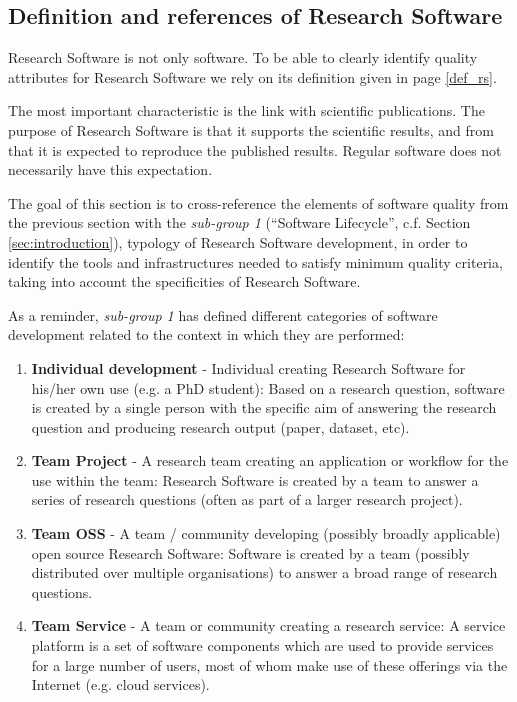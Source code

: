 \subsection{Definition and references of Research Software}
\label{subsec:defrs}

Research Software is not only software. To be able to clearly identify quality attributes for Research Software we rely on its definition given in page \ref{def_rs}.

The most important characteristic is the link with scientific publications. The purpose of Research Software is that it supports the scientific results, and from that it is expected to reproduce the published results. Regular software does not necessarily have this expectation.

The goal of this section is to cross-reference the elements of software quality from the previous section with the \textit{sub-group 1} \cite{sg1tf2023} (``Software Lifecycle'', c.f. Section \ref{sec:introduction}), typology of Research Software development, in order to identify the tools and infrastructures needed to satisfy minimum quality criteria, taking into account the specificities of Research Software.  

As a reminder, \textit{sub-group 1} has defined different categories of software development related to the context in which they are performed:

\begin{enumerate}
    \item \textbf{Individual development} - Individual creating Research Software for his/her own use (e.g. a PhD student): Based on a research question, software is created by a single person with the specific aim of answering the research question and producing research output (paper, dataset, etc).
    \item \textbf{Team Project} - A research team creating an application or workflow for the use within the team: Research Software is created by a team to answer a series of research questions (often as part of a larger research project).
    \item \textbf{Team OSS} - A team / community developing (possibly broadly applicable) open source Research Software: Software is created by a team (possibly distributed over multiple organisations) to answer a broad range of research questions.
    \item \textbf{Team Service} - A team or community creating a research service: A service platform is a set of software components which are used to provide services for a large number of users, most of whom make use of these offerings via the Internet (e.g. cloud services).
\end{enumerate}

